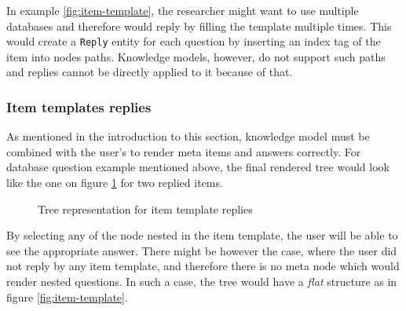 In example \ref{fig:item-template}, the researcher might want to use multiple databases and therefore would reply by filling the template multiple times.
This would create a \texttt{Reply} entity for each question by inserting an index tag of the item into nodes paths.
Knowledge models, however, do not support such paths and replies cannot be directly applied to it because of that.

\subsubsection*{Item templates replies}

As mentioned in the introduction to this section, knowledge model must be combined with the user's to render meta items and answers correctly.
For database question example mentioned above, the final rendered tree would look like the one on figure \ref{fig:item-template-items} for two replied items.

\begin{figure}[H]
    \caption{Tree representation for item template replies}\label{fig:item-template-items}
\end{figure}

By selecting any of the node nested in the item template, the user will be able to see the appropriate answer.
There might be however the case, where the user did not reply by any item template, and therefore there is no meta node which would render nested questions.
In such a case, the tree would have a \textit{flat} structure as in figure \ref{fig:item-template}.
